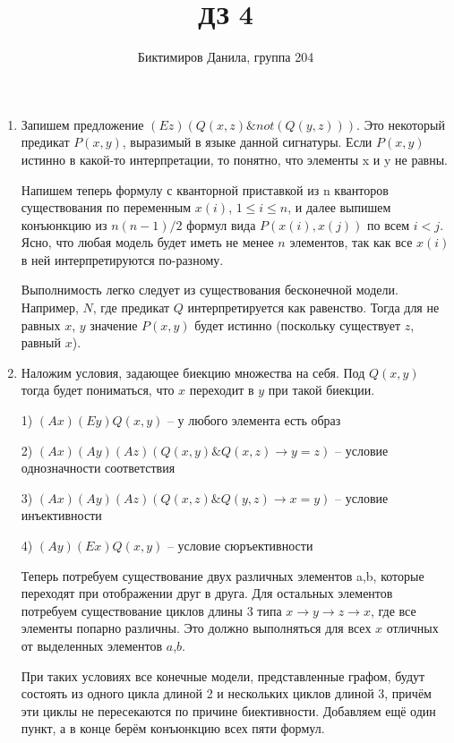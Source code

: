 \documentclass[11pt]{article}
\begin{document}
	
	\author{Биктимиров Данила, группа 204}
	\title{ДЗ 4}
	\date{}
	\maketitle
	
	\medskip
	
	\begin{enumerate}
		
		\item Запишем предложение $(Ez)(Q(x,z) \& not(Q(y,z)))$. Это некоторый предикат $P(x,y)$, выразимый в языке данной сигнатуры. Если $P(x,y)$ истинно в какой-то интерпретации, то понятно, что элементы x и y не равны.
		
		Напишем теперь формулу с кванторной приставкой из n кванторов существования по переменным $x(i)$, $1\le i\le n$, и далее выпишем конъюнкцию из $n(n-1)/2$ формул вида $P(x(i),x(j))$ по всем $i < j$. Ясно, что любая модель будет иметь не менее $n$ элементов, так как все $x(i)$ в ней интерпретируются по-разному.
		
		Выполнимость легко следует из существования бесконечной модели. Например, $N$, где предикат $Q$ интерпретируется как равенство. Тогда для не равных $x$, $y$ значение $P(x,y)$ будет истинно (поскольку существует $z$, равный $x$).
		
		\item Наложим условия, задающее биекцию множества на себя. Под $Q(x,y)$ тогда будет пониматься, что $x$ переходит в $y$ при такой биекции.
		
		1) $(Ax)(Ey)Q(x,y)$ -- у любого элемента есть образ
		
		2) $(Ax)(Ay)(Az)(Q(x,y)\& Q(x,z)\to y=z)$ -- условие однозначности соответствия
		
		3) $(Ax)(Ay)(Az)(Q(x,z)\& Q(y,z)\to x=y)$ -- условие инъективности
		
		4) $(Ay)(Ex)Q(x,y)$ -- условие сюръективности
		
		Теперь потребуем существование двух различных элементов a,b, которые переходят при отображении друг в друга. Для остальных элементов потребуем существование циклов длины 3 типа $x\to y\to z\to x$, где все элементы попарно различны. Это должно выполняться для всех $x$ отличных от выделенных элементов $a$,$b$.
		
		При таких условиях все конечные модели, представленные графом, будут состоять из одного цикла длиной 2 и нескольких циклов длиной 3, причём эти циклы не пересекаются по причине биективности. Добавляем ещё один пункт, а в конце берём конъюнкцию всех пяти формул.
		

\end{enumerate}
\end{document}
